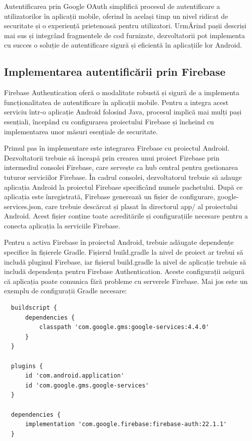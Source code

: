\documentclass[runningheads]{llncs}
\begin{document}

Autentificarea prin Google OAuth simplifică procesul de autentificare a utilizatorilor în aplicații mobile, oferind în același timp un nivel ridicat de securitate și o experiență prietenoasă pentru utilizatori. UrmĂrind pașii descriși mai sus și integrând fragmentele de cod furnizate, dezvoltatorii pot implementa cu succes o soluție de autentificare sigură și eficientă în aplicațiile lor Android.

\subsection{Implementarea autentificării prin Firebase}
Firebase Authentication oferă o modalitate robustă și sigură de a implementa funcționalitatea de autentificare în aplicații mobile. Pentru a integra acest serviciu într-o aplicație Android folosind Java, procesul implică mai mulți pași esențiali, începând cu configurarea proiectului Firebase și încheind cu implementarea unor măsuri esențiale de securitate.

Primul pas în implementare este integrarea Firebase cu proiectul Android. Dezvoltatorii trebuie să înceapă prin crearea unui proiect Firebase prin intermediul consolei Firebase, care servește ca hub central pentru gestionarea tuturor serviciilor Firebase. În cadrul consolei, dezvoltatorul trebuie să adauge aplicația Android la proiectul Firebase specificând numele pachetului. După ce aplicația este înregistrată, Firebase generează un fișier de configurare, google-services.json, care trebuie descărcat și plasat în directorul app/ al proiectului Android. Acest fișier conține toate acreditările și configurațiile necesare pentru a conecta aplicația la serviciile Firebase.

Pentru a activa Firebase în proiectul Android, trebuie adăugate dependențe specifice în fișierele Gradle. Fișierul build.gradle la nivel de proiect ar trebui să includă pluginul Firebase, iar fișierul build.gradle la nivel de aplicație trebuie să includă dependența pentru Firebase Authentication. Aceste configurații asigură că aplicația poate comunica fără probleme cu serverele Firebase. Mai jos este un exemplu de configurații Gradle necesare:
\begin{lstlisting}
  buildscript {
      dependencies {
          classpath 'com.google.gms:google-services:4.4.0'
      }
  }
  
  plugins {
      id 'com.android.application'
      id 'com.google.gms.google-services'
  }
  
  dependencies {
      implementation 'com.google.firebase:firebase-auth:22.1.1'
  }
\end{lstlisting}
\end{document}
